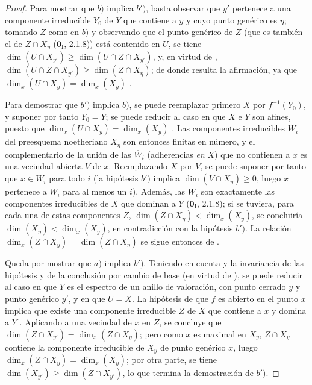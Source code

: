 \begin{proof}
Para mostrar que $b)$ implica $b')$, basta observar que $y'$ pertenece a una componente irreducible $Y_0$ de $Y$ que contiene a $y$ y cuyo punto genérico es $\eta$; tomando $Z$ como en $b)$ y observando que el punto genérico de $Z$ (que es también el de $Z\cap X_\eta$ ($\mathbf{0}_{\mathrm I}$, 2.1.8)) está contenido en $U$, se tiene $\dim(U\cap X_{y'})\geq\dim(U\cap Z\cap X_{y'})$, y, en virtud de , $\dim(U\cap Z\cap X_{y'})\geq\dim(Z\cap X_\eta)$; de donde resulta la afirmación, ya que $\dim_x(U\cap X_y)=\dim_x(X_y)$ .

Para demostrar que $b')$ implica $b)$, se puede reemplazar primero $X$ por $f^{-1}(Y_0)$, y suponer por tanto $Y_0=Y$; se puede reducir al caso en que $X$ e $Y$ son afines, puesto que $\dim_x(U\cap X_y)=\dim_x(X_y)$ .
Las componentes irreducibles $W_i$ del preesquema noetheriano $X_\eta$ son entonces finitas en número, y el complementario de la unión de las $\overline W_i$ (adherencias \emph{en} $X$) que no contienen a $x$ es una vecindad abierta $V$ de $x$.
Reemplazando $X$ por $V$, se puede suponer por tanto que $x\in\overline W_i$ para todo $i$ (la hipótesis $b')$ implica $\dim(V\cap X_\eta)\geq 0$, luego $x$ pertenece a $\overline W_i$ para al menos un $i$).
Además, las $\overline W_i$ son exactamente las componentes irreducibles de $X$ que dominan a $Y$ ($\mathbf{0}_{\mathrm I}$, 2.1.8); si se tuviera, para cada una de estas componentes $Z$, $\dim(Z\cap X_\eta)<\dim_x(X_y)$, se concluiría $\dim(X_\eta)<\dim_x(X_y)$, en contradicción con la hipótesis $b')$.
La relación $\dim_x(Z\cap X_y)=\dim(Z\cap X_\eta)$ se sigue entonces de .

Queda por mostrar que $a)$ implica $b')$.
Teniendo en cuenta  y la invariancia de las hipótesis y de la conclusión por cambio de base (en virtud de ), se puede reducir al caso en que $Y$ es el espectro de un anillo de valoración, con punto cerrado $y$ y punto genérico $y'$, y en que $U=X$.
La hipótesis de que $f$ es abierto en el punto $x$ implica que existe una componente irreducible $Z$ de $X$ que contiene a $x$ y domina a $Y$ .
Aplicando  a una vecindad de $x$ en $Z$, se concluye que $\dim(Z\cap X_{y'})=\dim_x(Z\cap X_y)$; pero como $x$ es maximal en $X_y$, $Z\cap X_y$ contiene la componente irreducible de $X_y$ de punto genérico $x$, luego $\dim_x(Z\cap X_y)=\dim_x(X_y)$; por otra parte, se tiene $\dim(X_{y'})\geq\dim(Z\cap X_{y'})$, lo que termina la demostración de $b')$.
\end{proof}


